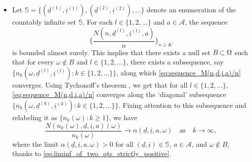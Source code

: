 \begin{itemize}
    \item {\color{black} 
    Let $\mathbb{S}=\{(\underline{d}^{(1)}, \underline{i}^{(1)}), (\underline{d}^{(2)}, \underline{i}^{(2)}), \ldots\}$ denote an enumeration of the countably infinite set $\mathbb{S}$.
For each $l\in \{1, 2, \ldots\}$ and $a\in \mathcal{A}$, the sequence
    \begin{equation}
    	\bigg\lbrace \frac{N(n, \underline{d}^{(l)}, \underline{i}^{(l)}, a)}{n} \bigg \rbrace_{n\geq K}
    	\label{eq:sequence_M(n,d,i,a)/n}
    \end{equation}
is bounded almost surely. This implies that there exists a null set $B \,{\color{black} \subset \Omega}$ such that for every $\omega \notin B$ and $l\in \{1, 2, \ldots\}$, there exists a subsequence, say $\{n_k(\omega, \underline{d}^{(l)}, \underline{i}^{(l)}): k\in \{1, 2, \ldots\}\}$, along which  \eqref{eq:sequence_M(n,d,i,a)/n}  converges. 
Using Tychonoff's theorem \cite[Theorem 37.3]{munkres2000topology}, we get that for all $l\in \{1, 2, \ldots\}$, \eqref{eq:sequence_M(n,d,i,a)/n} converges along the `diagonal' subsequence $\{n_{k}(\omega, \underline{d}^{(k)}, \underline{i}^{(k)}): k\in \{1, 2, \ldots\}\}$. Fixing attention to this subsequence and relabeling it as $\{n_k(\omega): k\geq 1\}$, we have}
    $$\frac{N(n_k(\omega), \underline{d}, \underline{i}, a)(\omega)}{n_k(\omega)} \longrightarrow \alpha(\underline{d}, \underline{i}, a, \omega) \quad \text{as}\quad k\to \infty,$$ where the limit $\alpha(\underline{d}, \underline{i}, a, \omega)>0$ for all $(\underline{d}, \underline{i})\in \mathbb{S}$, $ a\in \mathcal{A}$, and  $\omega\notin B$, thanks to \eqref{eq:liminf_of_two_qts_strictly_positive}.
\end{itemize}

